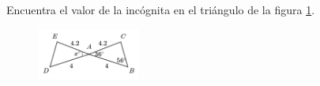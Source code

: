 \question[10]  Encuentra el valor de la incógnita en el triángulo de la figura \ref{fig:angle_triangle_11}.
\begin{figure}[H]
    \begin{center}
        \includegraphics[width=0.3\textwidth]{../images/angle_triangle_11.png}
    \end{center}
    \caption{}
    \label{fig:angle_triangle_11}
\end{figure}